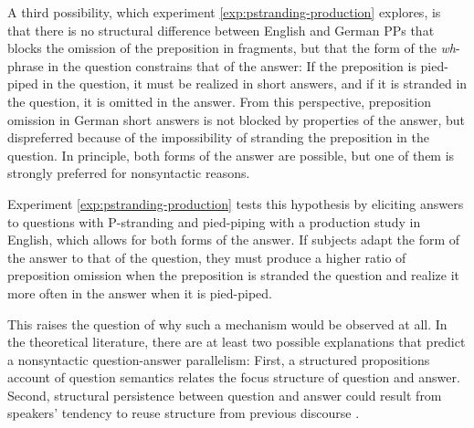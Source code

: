 A third possibility, which experiment \ref{exp:pstranding-production} explores, is that there is no structural difference between English and German PPs that blocks the omission of the preposition in fragments, but that the form of the \textit{wh}-phrase in the question constrains that of the answer: If the preposition is pied-piped in the question, it must be realized in short answers, and if it is stranded in the question, it is omitted in the answer. From this perspective, preposition omission in German short answers is not blocked by properties of the answer, but dispreferred because of the impossibility of stranding the preposition in the question. In principle, both forms of the answer are possible, but one of them is strongly preferred for nonsyntactic reasons.

Experiment \ref{exp:pstranding-production} tests this hypothesis by eliciting answers to questions with P-stranding and pied-piping with a production study in English, which allows for both forms of the answer. If subjects adapt the form of the answer to that of the question, they must produce a higher ratio of preposition omission when the preposition is stranded the question and realize it more often in the answer when it is pied-piped.

\newpage
\noindent This raises the question of why such a mechanism would be observed at all. In the theoretical literature, there are at least two possible explanations that predict a nonsyntactic question-answer parallelism: First, a structured propositions account of question semantics \citep{vonstechow1981, reich2002a} relates the focus structure of question and answer. Second, structural persistence \citep{nykiel2017} between question and answer could result from speakers' tendency to reuse structure from previous discourse \citep{levelt.kelter1982, nykiel2017}. 

\label{sec:psg-alternatives-structured}

